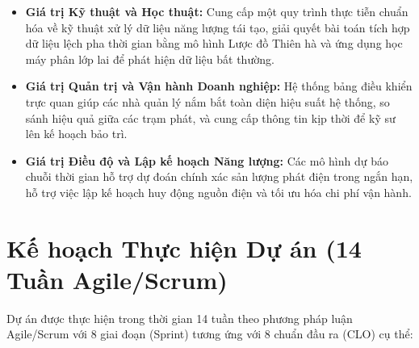 \documentclass[12pt, a4paper]{report}
\begin{document}
\begin{itemize}[noitemsep]
    \item \textbf{Giá trị Kỹ thuật và Học thuật:} Cung cấp một quy trình thực tiễn chuẩn hóa về kỹ thuật xử lý dữ liệu năng lượng tái tạo, giải quyết bài toán tích hợp dữ liệu lệch pha thời gian bằng mô hình Lược đồ Thiên hà và ứng dụng học máy phân lớp lai để phát hiện dữ liệu bất thường.
    \item \textbf{Giá trị Quản trị và Vận hành Doanh nghiệp:} Hệ thống bảng điều khiển trực quan giúp các nhà quản lý nắm bắt toàn diện hiệu suất hệ thống, so sánh hiệu quả giữa các trạm phát, và cung cấp thông tin kịp thời để kỹ sư lên kế hoạch bảo trì.
    \item \textbf{Giá trị Điều độ và Lập kế hoạch Năng lượng:} Các mô hình dự báo chuỗi thời gian hỗ trợ dự đoán chính xác sản lượng phát điện trong ngắn hạn, hỗ trợ việc lập kế hoạch huy động nguồn điện và tối ưu hóa chi phí vận hành.
\end{itemize}

\newpage
\section{Kế hoạch Thực hiện Dự án (14 Tuần Agile/Scrum)}
\label{sec:kehoach}

Dự án được thực hiện trong thời gian 14 tuần theo phương pháp luận Agile/Scrum với 8 giai đoạn (Sprint) tương ứng với 8 chuẩn đầu ra (CLO) cụ thể:
\end{document}

